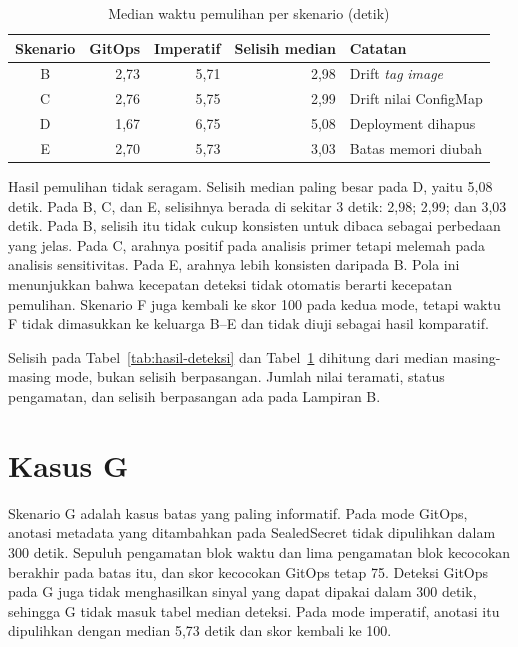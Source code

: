 \begin{table}[H]
  \centering
  \small
  \caption{Median waktu pemulihan per skenario (detik)}
  \label{tab:hasil-pemulihan}
  \begin{tabularx}{\textwidth}{|c|r|r|r|>{\raggedright\arraybackslash}X|}
    \hline
    Skenario & GitOps & Imperatif & Selisih median & Catatan \\
    \hline
    B & 2,73 & 5,71 & 2,98 & Drift \textit{tag} \textit{image} \\
    \hline
    C & 2,76 & 5,75 & 2,99 & Drift nilai ConfigMap \\
    \hline
    D & 1,67 & 6,75 & 5,08 & Deployment dihapus \\
    \hline
    E & 2,70 & 5,73 & 3,03 & Batas memori diubah \\
    \hline
  \end{tabularx}
\end{table}

Hasil pemulihan tidak seragam. Selisih median paling besar pada D, yaitu 5,08 detik. Pada B, C, dan E, selisihnya berada di sekitar 3 detik: 2,98; 2,99; dan 3,03 detik. Pada B, selisih itu tidak cukup konsisten untuk dibaca sebagai perbedaan yang jelas. Pada C, arahnya positif pada analisis primer tetapi melemah pada analisis sensitivitas. Pada E, arahnya lebih konsisten daripada B. Pola ini menunjukkan bahwa kecepatan deteksi tidak otomatis berarti kecepatan pemulihan. Skenario F juga kembali ke skor 100 pada kedua mode, tetapi waktu F tidak dimasukkan ke keluarga B--E dan tidak diuji sebagai hasil komparatif.

\noindent\footnotesize Selisih pada Tabel~\ref{tab:hasil-deteksi} dan Tabel~\ref{tab:hasil-pemulihan} dihitung dari median masing-masing mode, bukan selisih berpasangan. Jumlah nilai teramati, status pengamatan, dan selisih berpasangan ada pada Lampiran B.\normalsize

\section{Kasus G}
\label{sec:kasus-g}

Skenario G adalah kasus batas yang paling informatif. Pada mode GitOps, anotasi metadata yang ditambahkan pada SealedSecret tidak dipulihkan dalam 300 detik. Sepuluh pengamatan blok waktu dan lima pengamatan blok kecocokan berakhir pada batas itu, dan skor kecocokan GitOps tetap 75. Deteksi GitOps pada G juga tidak menghasilkan sinyal yang dapat dipakai dalam 300 detik, sehingga G tidak masuk tabel median deteksi. Pada mode imperatif, anotasi itu dipulihkan dengan median 5,73 detik dan skor kembali ke 100.

